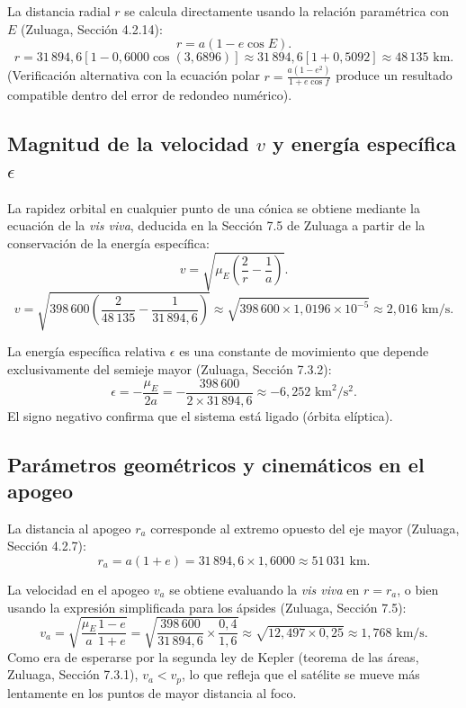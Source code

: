 \documentclass[12pt, a4paper]{article}
\begin{document}
La distancia radial $r$ se calcula directamente usando la relación paramétrica con $E$ (Zuluaga, Sección 4.2.14):
$$ r = a(1 - e\cos E). $$
$$ r = 31\,894,6 \left[ 1 - 0,6000 \cos(3,6896) \right] \approx 31\,894,6 \left[ 1 + 0,5092 \right] \approx 48\,135 \text{ km}. $$
(Verificación alternativa con la ecuación polar $r = \frac{a(1-e^2)}{1+e\cos f}$ produce un resultado compatible dentro del error de redondeo numérico).

\subsection*{Magnitud de la velocidad $v$ y energía específica $\epsilon$}
La rapidez orbital en cualquier punto de una cónica se obtiene mediante la ecuación de la \textit{vis viva}, deducida en la Sección 7.5 de Zuluaga a partir de la conservación de la energía específica:
$$ v = \sqrt{\mu_E \left( \frac{2}{r} - \frac{1}{a} \right)}. $$
$$ v = \sqrt{398\,600 \left( \frac{2}{48\,135} - \frac{1}{31\,894,6} \right)} \approx \sqrt{398\,600 \times 1,0196 \times 10^{-5}} \approx 2,016 \text{ km/s}. $$

La energía específica relativa $\epsilon$ es una constante de movimiento que depende exclusivamente del semieje mayor (Zuluaga, Sección 7.3.2):
$$ \epsilon = -\frac{\mu_E}{2a} = -\frac{398\,600}{2 \times 31\,894,6} \approx -6,252 \text{ km}^2/\text{s}^2. $$
El signo negativo confirma que el sistema está ligado (órbita elíptica).

\subsection*{Parámetros geométricos y cinemáticos en el apogeo}
La distancia al apogeo $r_a$ corresponde al extremo opuesto del eje mayor (Zuluaga, Sección 4.2.7):
$$ r_a = a(1 + e) = 31\,894,6 \times 1,6000 \approx 51\,031 \text{ km}. $$

La velocidad en el apogeo $v_a$ se obtiene evaluando la \textit{vis viva} en $r = r_a$, o bien usando la expresión simplificada para los ápsides (Zuluaga, Sección 7.5):
$$ v_a = \sqrt{\frac{\mu_E}{a} \frac{1-e}{1+e}} = \sqrt{\frac{398\,600}{31\,894,6} \times \frac{0,4}{1,6}} \approx \sqrt{12,497 \times 0,25} \approx 1,768 \text{ km/s}. $$
Como era de esperarse por la segunda ley de Kepler (teorema de las áreas, Zuluaga, Sección 7.3.1), $v_a < v_p$, lo que refleja que el satélite se mueve más lentamente en los puntos de mayor distancia al foco.
\end{document}
